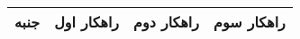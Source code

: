 \begin{table}[H]
\centering
\begin{tabular}{|c|c|c|c|}
\hline
\textbf{جنبه} & \textbf{راهکار اول} & \textbf{راهکار دوم} & \textbf{راهکار سوم} \\
\hline

\end{tabular}
\end{table}
